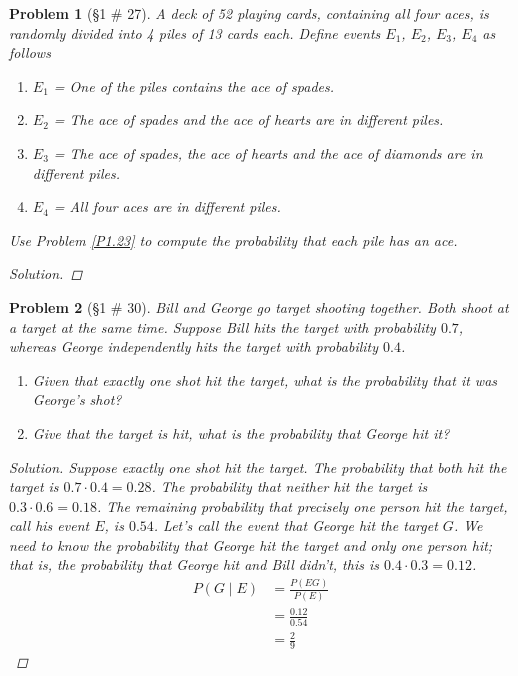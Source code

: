 \documentclass[11pt, oneside]{book}   	%
\newtheorem{problem}{Problem}[chapter]
\begin{document}
\begin{spacing}{1.618}
\begin{problem}[\S 1 \# 27]
	A deck of 52 playing cards, containing all four aces, is randomly divided into 4 piles of 13 cards each. Define events $E_1$, $E_2$, $E_3$, $E_4$ as follows
	\begin{enumerate}
		\item $E_1$ = One of the piles contains the ace of spades.
		\item $E_2$ = The ace of spades and the ace of hearts are in different piles.
		\item $E_3$ = The ace of spades, the ace of hearts and the ace of diamonds are in different piles. 
		\item $E_4$ = All four aces are in different piles.
	\end{enumerate}
	Use Problem \ref{P1.23} to compute the probability that each pile has an ace. 
	\begin{proof}[Solution]
	
	\end{proof}
\end{problem}

\begin{problem}[\S 1 \# 30]
	Bill and George go target shooting together. Both shoot at a target at the same time. Suppose Bill hits the target with probability $0.7$, whereas George independently hits the target with probability $0.4$. 
	\begin{enumerate}
		\item Given that exactly one shot hit the target, what is the probability that it was George's shot? 
		\item Give that the target is hit, what is the probability that George hit it? 
	\end{enumerate}
	\begin{proof}[Solution]
		Suppose exactly one shot hit the target. The probability that both hit the target is $0.7\cdot 0.4=0.28$. The probability that neither hit the target is $0.3\cdot 0.6=0.18$. The remaining probability that precisely one person hit the target, call his event $E$, is $0.54$. Let's call the event that George hit the target $G$. We need to know the probability that George hit the target and only one person hit; that is, the probability that George hit and Bill didn't, this is $0.4\cdot 0.3 = 0.12$. 
		\begin{alignat*}{4}
			P(G\mid E) &= \frac{P(EG)}{P(E)} \\
				&=\frac{0.12}{0.54} \\ 
				&=\frac{2}{9}
		\end{alignat*}
		

\end{proof}
\end{problem}
\end{spacing}
\end{document}
